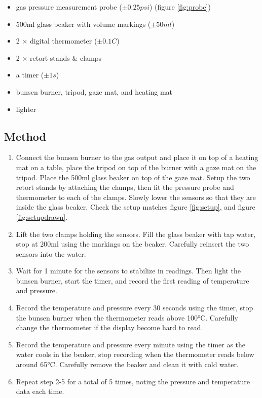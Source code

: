 \documentclass[a4paper,12pt]{article}
\begin{document}
\begin{itemize}
    \item gas pressure measurement probe ($\pm 0.25\si{psi}$) (figure \ref{fig:probe})
    \item 500ml glass beaker with volume markings ($\pm 50\si{ml}$)
    \item 2 $\times$ digital thermometer ($\pm 0.1\si{C}$)
    \item 2 $\times$ retort stands \& clamps
    \item a timer ($\pm 1\si{s}$)
    \item bunsen burner, tripod, gaze mat, and heating mat
    \item lighter
\end{itemize}


\newpage
\subsection{Method}


\begin{enumerate}
    \item Connect the bunsen burner to the gas output and place it on top of a heating mat on a table, place the tripod on top of the burner with a gaze mat on the tripod. Place the 500ml glass beaker on top of the gaze mat. Setup the two retort stands by attaching the clamps, then fit the pressure probe and thermometer to each of the clamps. Slowly lower the sensors so that they are inside the glass beaker. Check the setup matches figure \ref{fig:setup}, and figure \ref{fig:setupdrawn}.
    \item Lift the two clamps holding the sensors. Fill the glass beaker with tap water, stop at 200ml using the markings on the beaker. Carefully reinsert the two sensors into the water.
    \item Wait for 1 minute for the sensors to stabilize in readings. Then light the bunsen burner, start the timer, and record the first reading of temperature and pressure.
    \item Record the temperature and pressure every 30 seconds using the timer, stop the bunsen burner when the thermometer reads above 100$\si{\celsius}$. Carefully change the thermometer if the display become hard to read.
    \item Record the temperature and pressure every minute using the timer as the water cools in the beaker, stop recording when the thermometer reads below around 65$\si{\celsius}$. Carefully remove the beaker and clean it with cold water.
    \item Repeat step 2-5 for a total of 5 times, noting the pressure and temperature data each time.
\end{enumerate}
\end{document}
